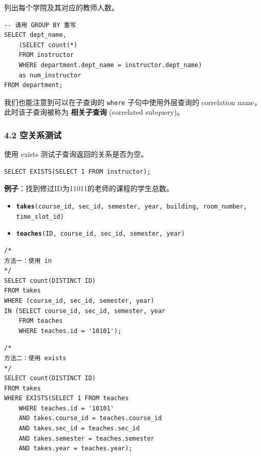 \documentclass[aspectratio=169, 14pt]{beamer}
\begin{document}
\begin{frame}[fragile]
 列出每个学院及其对应的教师人数。

 \begin{verbatim}
-- 请用 GROUP BY 重写
SELECT dept_name,
    (SELECT count(*)
    FROM instructor
    WHERE department.dept_name = instructor.dept_name)
    as num_instructor
FROM department;
 \end{verbatim}

我们也能注意到可以在子查询的 \texttt{where} 子句中使用外层查询的 \alert{correlation name}，此时该子查询被称为 \textbf{相关子查询} (correlated subquery)。
 
\end{frame}

\begin{frame}[fragile]
    \frametitle{4.2 空关系测试}
使用 \alert{exists} 测试子查询返回的关系是否为空。

\begin{verbatim}
SELECT EXISTS(SELECT 1 FROM instructor);
\end{verbatim}

\pause
\textbf{例子}：找到修过ID为11011的老师的课程的学生总数。
\begin{itemize}
    \item \texttt{\textbf{takes}(course\_id, sec\_id, semester, year, building, room\_number, time\_slot\_id)}
    \item \texttt{\textbf{teaches}(ID, course\_id, sec\_id, semester, year)}
\end{itemize}
\end{frame}

\begin{frame}[fragile]

\begin{verbatim}
/*
方法一：使用 in
*/
SELECT count(DISTINCT ID)
FROM takes
WHERE (course_id, sec_id, semester, year)
IN (SELECT course_id, sec_id, semester, year
    FROM teaches
    WHERE teaches.id = '10101');    
\end{verbatim}
\end{frame}

\begin{frame}[fragile]
    \begin{verbatim}
/*
方法二：使用 exists
*/
SELECT count(DISTINCT ID)
FROM takes
WHERE EXISTS(SELECT 1 FROM teaches
    WHERE teaches.id = '10101'
    AND takes.course_id = teaches.course_id
    AND takes.sec_id = teaches.sec_id
    AND takes.semester = teaches.semester
    AND takes.year = teaches.year);
    \end{verbatim}

\end{frame}
\end{document}
